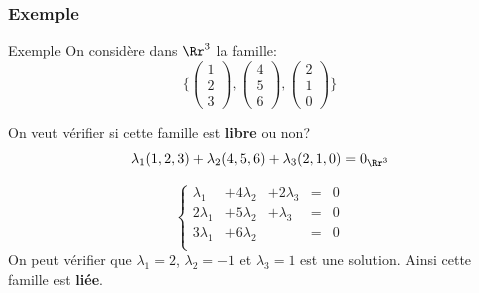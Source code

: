 \documentclass[dvipsnames]{beamer}
\begin{document}
\begin{frame}[t]
  \frametitle{Exemple}
 \begin{block}{Exemple }
  On considère dans $\Rr^3$ la famille:
  \begin{equation*}
    \Big\{ 
      \begin{pmatrix}
       1\\2\\3 
      \end{pmatrix}
      ,
      \begin{pmatrix}
       4\\5\\6 
      \end{pmatrix}
      ,
      \begin{pmatrix}
       2\\1\\0 
      \end{pmatrix}
    \Big\}
  \end{equation*}
 \end{block} 

 \small
 On veut vérifier si cette famille est \textbf{libre} ou non?
 \begin{equation*}
   \lambda_1 (1,2,3) + \lambda_2(4,5,6) + \lambda_3(2,1,0)= 0_{\Rr^3}
 \end{equation*}

 \begin{equation*}
   \left\{
     \begin{array}{lllll}
       \lambda_1 &+ 4\lambda_2 &+ 2\lambda_3 &=& 0\\ 
       2\lambda_1 &+ 5\lambda_2 &+ \lambda_3 &=& 0\\ 
       3\lambda_1 &+ 6\lambda_2 &  &=& 0\\ 
     \end{array}\right.
 \end{equation*}
 \pause
 On peut vérifier que $\lambda_1 = 2$, $\lambda_2 = -1$ et $\lambda_3 = 1$ est
 une solution. Ainsi cette famille est \textbf{\alert{liée}}.
\end{frame}
\end{document}

